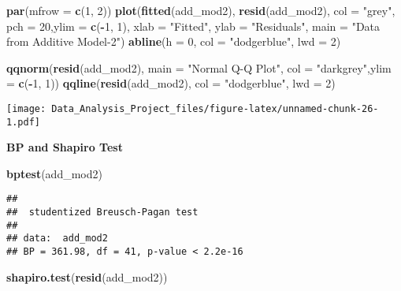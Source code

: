 \documentclass[]{article}
\newenvironment{Shaded}{\begin{snugshade}}{\end{snugshade}}
\newcommand{\KeywordTok}[1]{\textcolor[rgb]{0.13,0.29,0.53}{\textbf{#1}}}
\newcommand{\DataTypeTok}[1]{\textcolor[rgb]{0.13,0.29,0.53}{#1}}
\newcommand{\DecValTok}[1]{\textcolor[rgb]{0.00,0.00,0.81}{#1}}
\newcommand{\StringTok}[1]{\textcolor[rgb]{0.31,0.60,0.02}{#1}}
\newcommand{\OperatorTok}[1]{\textcolor[rgb]{0.81,0.36,0.00}{\textbf{#1}}}
\newcommand{\NormalTok}[1]{#1}
\begin{document}
\begin{Shaded}
\begin{Highlighting}[]
\KeywordTok{par}\NormalTok{(}\DataTypeTok{mfrow =} \KeywordTok{c}\NormalTok{(}\DecValTok{1}\NormalTok{, }\DecValTok{2}\NormalTok{))}
\KeywordTok{plot}\NormalTok{(}\KeywordTok{fitted}\NormalTok{(add_mod2), }\KeywordTok{resid}\NormalTok{(add_mod2), }\DataTypeTok{col =} \StringTok{"grey"}\NormalTok{, }\DataTypeTok{pch =} \DecValTok{20}\NormalTok{,}\DataTypeTok{ylim =} \KeywordTok{c}\NormalTok{(}\OperatorTok{-}\DecValTok{1}\NormalTok{, }\DecValTok{1}\NormalTok{),}
    \DataTypeTok{xlab =} \StringTok{"Fitted"}\NormalTok{, }\DataTypeTok{ylab =} \StringTok{"Residuals"}\NormalTok{, }\DataTypeTok{main =} \StringTok{"Data from Additive Model-2"}\NormalTok{)}
\KeywordTok{abline}\NormalTok{(}\DataTypeTok{h =} \DecValTok{0}\NormalTok{, }\DataTypeTok{col =} \StringTok{"dodgerblue"}\NormalTok{, }\DataTypeTok{lwd =} \DecValTok{2}\NormalTok{)}

\KeywordTok{qqnorm}\NormalTok{(}\KeywordTok{resid}\NormalTok{(add_mod2), }\DataTypeTok{main =} \StringTok{"Normal Q-Q Plot"}\NormalTok{, }\DataTypeTok{col =} \StringTok{"darkgrey"}\NormalTok{,}\DataTypeTok{ylim =} \KeywordTok{c}\NormalTok{(}\OperatorTok{-}\DecValTok{1}\NormalTok{, }\DecValTok{1}\NormalTok{))}
\KeywordTok{qqline}\NormalTok{(}\KeywordTok{resid}\NormalTok{(add_mod2), }\DataTypeTok{col =} \StringTok{"dodgerblue"}\NormalTok{, }\DataTypeTok{lwd =} \DecValTok{2}\NormalTok{)}
\end{Highlighting}
\end{Shaded}

\texttt{[image: Data\_Analysis\_Project\_files/figure-latex/unnamed-chunk-26-1.pdf]}

\textbf{BP and Shapiro Test }

\begin{Shaded}
\begin{Highlighting}[]
\KeywordTok{bptest}\NormalTok{(add_mod2)}
\end{Highlighting}
\end{Shaded}

\begin{verbatim}
## 
##  studentized Breusch-Pagan test
## 
## data:  add_mod2
## BP = 361.98, df = 41, p-value < 2.2e-16
\end{verbatim}

\begin{Shaded}
\begin{Highlighting}[]
\KeywordTok{shapiro.test}\NormalTok{(}\KeywordTok{resid}\NormalTok{(add_mod2))}
\end{Highlighting}
\end{Shaded}
\end{document}
